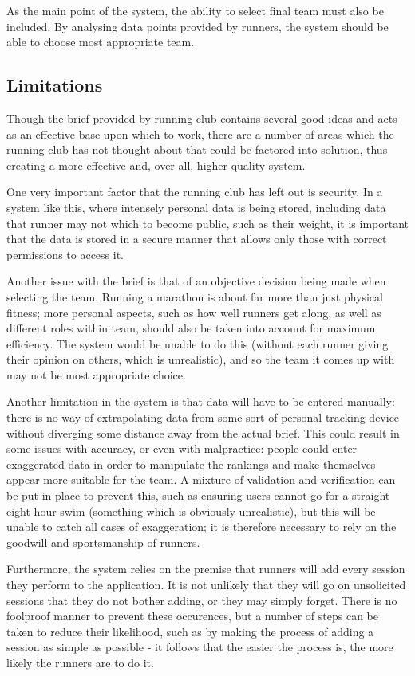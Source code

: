 \documentclass{article}[12pt,a4paper]
\begin{document}
As the main point of the system, the ability to select final team must also be included. By analysing data points provided by runners, the system should be able to choose most appropriate team.

\subsection{Limitations}
Though the brief provided by running club contains several good ideas and acts as an effective base upon which to work, there are a number of areas which the running club has not thought about that could be factored into solution, thus creating a more effective and, over all, higher quality system. 

One very important factor that the running club has left out is security. In a system like this, where intensely personal data is being stored, including data that runner may not which to become public, such as their weight, it is important that the data is stored in a secure manner that allows only those with correct permissions to access it. 

Another issue with the brief is that of an objective decision being made when selecting the team. Running a marathon is about far more than just physical fitness; more personal aspects, such as how well runners get along, as well as different roles within team, should also be taken into account for maximum efficiency. The system would be unable to do this (without each runner giving their opinion on others, which is unrealistic), and so the team it comes up with may not be most appropriate choice. 

Another limitation in the system is that data will have to be entered manually: there is no way of extrapolating data from some sort of personal tracking device without diverging some distance away from the actual brief. This could result in some issues with accuracy, or even with malpractice: people could enter exaggerated data in order to manipulate the rankings and make themselves appear more suitable for the team. A mixture of validation and verification can be put in place to prevent this, such as ensuring users cannot go for a straight eight hour swim (something which is obviously unrealistic), but this will be unable to catch all cases of exaggeration; it is therefore necessary to rely on the goodwill and sportsmanship of runners.

Furthermore, the system relies on the premise that runners will add every session they perform to the application. It is not unlikely that they will go on unsolicited sessions that they do not bother adding, or they may simply forget. There is no foolproof manner to prevent these occurences, but a number of steps can be taken to reduce their likelihood, such as by making the process of adding a session as simple as possible - it follows that the easier the process is, the more likely the runners are to do it.
\end{document}
